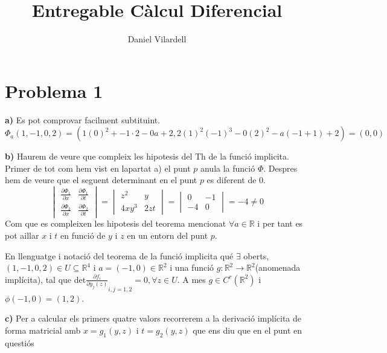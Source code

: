 \documentclass[12pt, a4papre]{article}
\author{Daniel Vilardell}
\title{Entregable Càlcul Diferencial}
\date{}
\begin{document}
	\maketitle
	\section{Problema 1}
	
	\textbf{a)} Es pot comprovar facilment subtituint.
	\[
	\Phi_a(1,-1,0,2)=(1(0)^2+-1\cdot2-0a+2, 2(1)^2(-1)^3-0(2)^2-a(-1+1)+2)=(0,0)
	\]
	
	\textbf{b)}
	Haurem de veure que compleix les hipotesis del Th de la funció implicita. Primer de tot com hem vist en lapartat a) el punt $p$ anula la funció $\Phi$.
	Despres hem de veure que el seguent determinant en el punt $p$ es diferent de 0.
	\[
	\begin{vmatrix}
		\frac{\partial \Phi_1}{\partial x} 	&\frac{\partial \Phi_1}{\partial t}\\
		\frac{\partial \Phi_2}{\partial x} 	&\frac{\partial \Phi_2}{\partial t}
	\end{vmatrix}
	=
	\begin{vmatrix}
		z^2		&y\\
		4xy^3	&2zt
	\end{vmatrix}
	=
	\begin{vmatrix}
		0	&-1\\
		-4	&0
	\end{vmatrix}
	= -4 \ne 0
	\]
	Com que es compleixen les hipotesis del teorema mencionat $\forall a \in \mathbb{R}$ i per tant es pot aillar $x$ i $t$ en funció de $y$ i $z$ en un entorn del punt $p$.
	
	En llenguatge i notació del teorema de la funció implicita qué $\exists$ oberts, $(1,-1,0,2)\in U\subseteq \mathbb{R}^4$ i $a=(-1,0)\in \mathbb{R}^2 $
	i una funció $g : \mathbb{R}^2\rightarrow \mathbb{R}^2$(anomenada implícita), tal que det$\frac{\partial{f}_i}{\partial y_j(z)}_{i,j=1,2}=0, \forall z \in U$.
	A mes $g \in C^r(\mathbb{R}^2)$ i $\phi(-1,0)=(1,2)$.
	
	\textbf{c)} Per a calcular els primers quatre valors recorrerem a la derivació implícita de forma matricial amb $x=g_1(y,z)$ i $t=g_2(y,z)$ que ens diu que 
	en el punt en questiós
	
\end{document}

